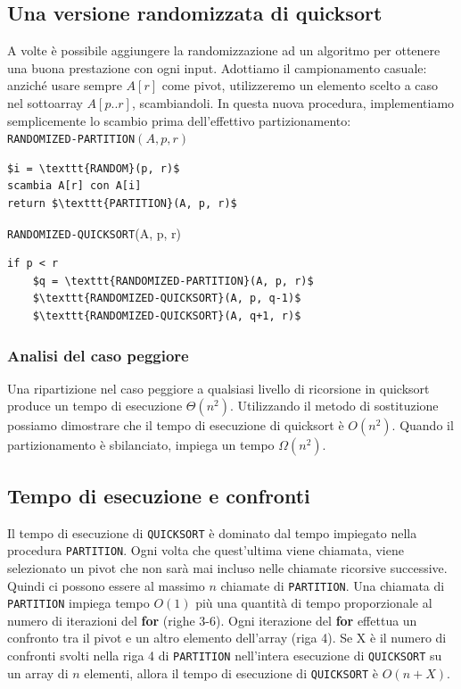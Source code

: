 \documentclass[11pt,a4paper]{article}
\begin{document}
\subsection{Una versione randomizzata di quicksort}
A volte è possibile aggiungere la randomizzazione ad un algoritmo per ottenere una buona prestazione con
ogni input. Adottiamo il campionamento casuale: anziché usare sempre $A[r]$ come pivot, utilizzeremo un
elemento scelto a caso nel sottoarray $A[p..r]$, scambiandoli.
In questa nuova procedura, implementiamo semplicemente lo scambio prima dell’effettivo partizionamento:\medskip\\
\texttt{RANDOMIZED-PARTITION}$(A, p, r)$
\begin{lstlisting}[mathescape=true]
$i = \texttt{RANDOM}(p, r)$
scambia A[r] con A[i]
return $\texttt{PARTITION}(A, p, r)$
\end{lstlisting}
\medskip
%
\texttt{RANDOMIZED-QUICKSORT}(A, p, r)
\begin{lstlisting}[mathescape=true]
if p < r
    $q = \texttt{RANDOMIZED-PARTITION}(A, p, r)$
    $\texttt{RANDOMIZED-QUICKSORT}(A, p, q-1)$
    $\texttt{RANDOMIZED-QUICKSORT}(A, q+1, r)$
\end{lstlisting}

\subsubsection{Analisi del caso peggiore}
Una ripartizione nel caso peggiore a qualsiasi livello di ricorsione in quicksort produce un tempo di esecuzione
$\Theta(n^2)$. Utilizzando il metodo di sostituzione possiamo dimostrare che il tempo di esecuzione di quicksort è
$O(n^2)$.
Quando il partizionamento è sbilanciato, impiega un tempo $\Omega(n^2)$.

\subsection{Tempo di esecuzione e confronti}
Il tempo di esecuzione di \texttt{QUICKSORT} è dominato dal tempo impiegato nella procedura \texttt{PARTITION}. Ogni volta che quest’ultima viene chiamata, viene selezionato un pivot che non sarà mai incluso nelle chiamate ricorsive successive. Quindi ci possono essere al massimo $n$ chiamate di \texttt{PARTITION}. Una chiamata di \texttt{PARTITION} impiega tempo $O(1)$ più una quantità di tempo proporzionale al numero di iterazioni del \textbf{for} (righe 3-6). Ogni iterazione del \textbf{for} effettua un confronto tra il pivot e un altro elemento dell’array (riga 4).
Se X è il numero di confronti svolti nella riga 4 di \texttt{PARTITION} nell’intera esecuzione di \texttt{QUICKSORT} su un array di $n$ elementi, allora il tempo di esecuzione di \texttt{QUICKSORT} è $O(n+X)$.
\end{document}
